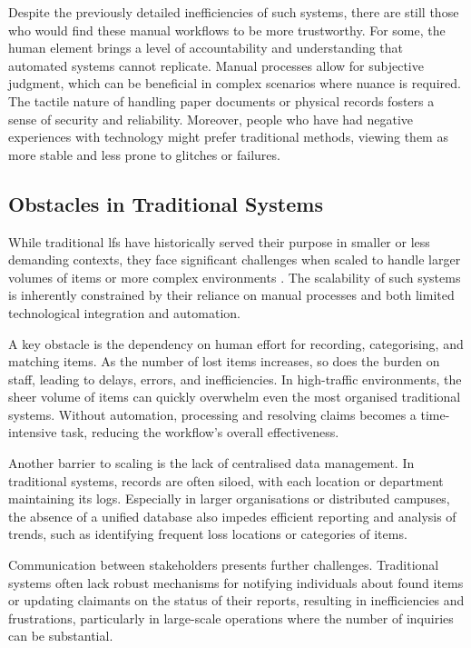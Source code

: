 Despite the previously detailed inefficiencies of such systems, there are still those who would find these manual workflows to be more trustworthy. For some, the human element brings a level of accountability and understanding that automated systems cannot replicate. Manual processes allow for subjective judgment, which can be beneficial in complex scenarios where nuance is required. The tactile nature of handling paper documents or physical records fosters a sense of security and reliability. Moreover, people who have had negative experiences with technology might prefer traditional methods, viewing them as more stable and less prone to glitches or failures.


\subsection{Obstacles in Traditional Systems} 

While traditional \ac{lfs} have historically served their purpose in smaller or less demanding contexts, they face significant challenges when scaled to handle larger volumes of items or more complex environments \cite{Mayura2024}. The scalability of such systems is inherently constrained by their reliance on manual processes and both limited technological integration and automation.

A key obstacle is the dependency on human effort for recording, categorising, and matching items. As the number of lost items increases, so does the burden on staff, leading to delays, errors, and inefficiencies. In high-traffic environments, the sheer volume of items can quickly overwhelm even the most organised traditional systems. Without automation, processing and resolving claims becomes a time-intensive task, reducing the workflow's overall effectiveness. 

Another barrier to scaling is the lack of centralised data management. In traditional systems, records are often siloed, with each location or department maintaining its logs. Especially in larger organisations or distributed campuses, the absence of a unified database also impedes efficient reporting and analysis of trends, such as identifying frequent loss locations or categories of items.

Communication between stakeholders presents further challenges. Traditional systems often lack robust mechanisms for notifying individuals about found items or updating claimants on the status of their reports, resulting in inefficiencies and frustrations, particularly in large-scale operations where the number of inquiries can be substantial.

